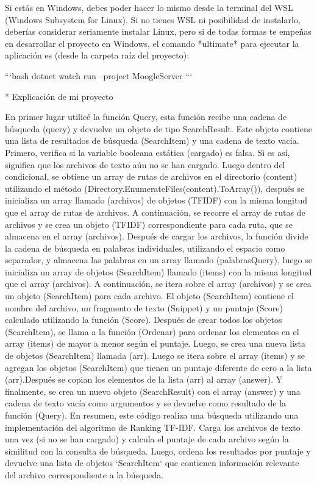 \documentclass{article}
\begin{document}
Si estás en Windows, debes poder hacer lo mismo desde la terminal del WSL (Windows Subsystem for Linux). Si no tienes WSL ni posibilidad de instalarlo, deberías considerar seriamente instalar Linux, pero si de todas formas te empeñas en desarrollar el proyecto en Windows, el comando *ultimate* para ejecutar la aplicación es (desde la carpeta raíz del proyecto):

```bash
dotnet watch run --project MoogleServer
```

 * Explicación de mi proyecto


En primer lugar utilicé la función Query, esta función recibe una cadena de búsqueda (query) y devuelve un objeto de tipo SearchResult. Este objeto contiene una lista de resultados de búsqueda (SearchItem) y una cadena de texto vacía.  Primero, verifica si la variable booleana estática (cargado) es falsa. Si es así, significa que los archivos de texto aún no se han cargado. Luego dentro del condicional, se obtiene un array de rutas de archivos en el directorio (content) utilizando el método (Directory.EnumerateFiles(content).ToArray()), después se inicializa un array llamado (archivos) de objetos (TFIDF) con la misma longitud que el array de rutas de archivos.  A continuación, se recorre el array de rutas de archivos y se crea un objeto (TFIDF) correspondiente para cada ruta, que se almacena en el array (archivos).  Después de cargar los archivos, la función divide la cadena de búsqueda en palabras individuales, utilizando el espacio como separador, y almacena las palabras en un array llamado (palabrasQuery), luego se inicializa un array de objetos (SearchItem) llamado (items) con la misma longitud que el array (archivos).  A continuación, se itera sobre el array (archivos) y se crea un objeto (SearchItem) para cada archivo. El objeto (SearchItem) contiene el nombre del archivo, un fragmento de texto (Snippet) y un puntaje (Score) calculado utilizando la función (Score). Después de crear todos los objetos (SearchItem), se llama a la función (Ordenar) para ordenar los elementos en el array (items) de mayor a menor según el puntaje. Luego, se crea una nueva lista de objetos (SearchItem) llamada (arr). Luego  se itera sobre el array (items) y se agregan los objetos (SearchItem) que tienen un puntaje diferente de cero a la lista (arr).Después se copian los elementos de la lista (arr) al array (answer). Y finalmente, se crea un nuevo objeto (SearchResult) con el array (answer) y una cadena de texto vacía como argumentos y se devuelve como resultado de la función (Query). En resumen, este código realiza una búsqueda utilizando una implementación del algoritmo de Ranking TF-IDF. Carga los archivos de texto una vez (si no se han cargado) y calcula el puntaje de cada archivo según la similitud con la consulta de búsqueda. Luego, ordena los resultados por puntaje y devuelve una lista de objetos `SearchItem` que contienen información relevante del archivo correspondiente a la búsqueda.


  
\end{document}
